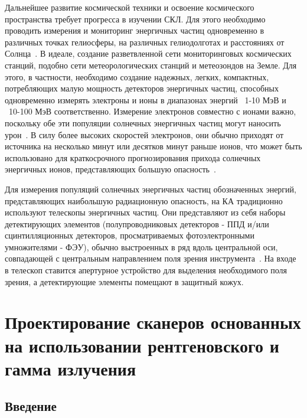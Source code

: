 Дальнейшее развитие космической техники и освоение космического пространства
требует прогресса в изучении СКЛ. Для этого необходимо проводить измерения и
мониторинг энергичных частиц одновременно в различных точках гелиосферы, на
различных гелиодолготах и расстояниях от Солнца~\cite{schrijver2015understanding}. В идеале, создание разветвленной сети мониторинговых космических станций, подобно сети метеорологических станций и метеозондов на Земле. Для этого, в частности, необходимо создание надежных, легких, компактных, потребляющих малую мощность детекторов энергичных частиц, способных одновременно измерять электроны и ионы в диапазонах энергий ~1-10 МэВ и ~10-100 МэВ соответственно. Измерение электронов совместно с ионами важно, поскольку обе эти популяции солнечных энергичных частиц могут наносить урон~\cite{petrukovich2008}. В силу более высоких скоростей электронов, они обычно приходят от источника на несколько минут или десятков минут раньше ионов, что может быть использовано для краткосрочного прогнозирования прихода солнечных энергичных ионов, представляющих большую опасность~\cite{posner2007up}.

Для измерения популяций солнечных энергичных частиц обозначенных энергий,
представляющих наибольшую радиационную опасность, на КА традиционно используют
телескопы энергичных частиц. Они представляют из себя наборы детектирующих
элементов (полупроводниковых детекторов - ППД и/или сцинтилляционных детекторов, просматриваемых фотоэлектронными умножителями - ФЭУ), обычно выстроенных в ряд вдоль центральной оси, совпадающей с центральным направлением поля зрения инструмента~\cite{wuest2007calibration,galperin1972}. На входе в телескоп ставится апертурное устройство для выделения необходимого поля зрения, а детектирующие элементы помещают в защитный кожух.


\section{Проектирование сканеров основанных на использовании рентгеновского и гамма излучения
}\label{sec:detectors/scanners}


\subsection{Введение}


